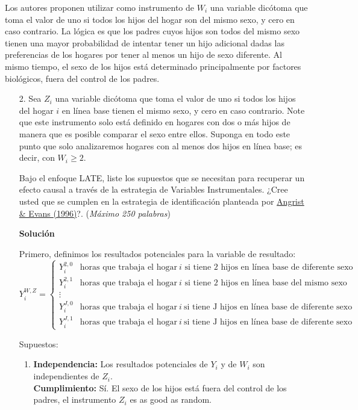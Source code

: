 \documentclass[a4paper, answers, addpoints, 11pt]{exam}
\newenvironment{solucion}{%
  \begin{mdframed}[
    backgroundcolor=blue!5,    %
    linecolor=blue!50,          %
    linewidth=2pt,              %
    leftmargin=10pt,            %
    rightmargin=8pt,           %
    topline=true,              %
    bottomline=true,            %
    roundcorner=10pt,           %
    innerleftmargin=10pt,       %
    innerrightmargin=10pt,      %
    innerbottommargin=10pt,     %
    innertopmargin=10pt         %
  ]%
  \begin{tcolorbox}[colframe=blue!50!black, colback=blue!50, coltitle=white, sharp corners=all, boxrule=1mm, width=\textwidth, halign=left, valign=center, top=0mm, bottom=0mm, left=0mm, right=0mm] \textbf{Solución} \end{tcolorbox} }{\end{mdframed}}
\begin{document}
\bigbreak
Los autores proponen utilizar como instrumento de \(W_i\) una variable dicótoma que toma el valor de uno si todos los hijos del hogar son del mismo sexo, y cero en caso contrario. La lógica es que los padres cuyos hijos son todos del mismo sexo tienen una mayor probabilidad de intentar tener un hijo adicional dadas las preferencias de los hogares por tener al menos un hijo de sexo diferente. Al mismo tiempo, el sexo de los hijos está determinado principalmente por factores biológicos, fuera del control de los padres. 

\begin{enumerate}
    \item[2.] Sea \(Z_i\) una variable dicótoma que toma el valor de uno si todos los hijos del hogar \(i\) en línea base tienen el mismo sexo, y cero en caso contrario. Note que este instrumento solo está definido en hogares con dos o más hijos de manera que es posible comparar el sexo entre ellos. Suponga en todo este punto que solo analizaremos hogares con al menos dos hijos en línea base; es decir, con $W_i \geq 2$.

    \bigbreak
    Bajo el enfoque LATE, liste los supuestos que se necesitan para recuperar un efecto causal a través de la estrategia de Variables Instrumentales. ¿Cree usted que se cumplen en la estrategia de identificación planteada por \href{https://www.nber.org/system/files/working_papers/w5778/w5778.pdf}{Angrist \& Evans (1996)}?. (\textit{Máximo 250 palabras})  

\begin{solucion}
Primero, definimos los resultados potenciales para la variable de resultado: 
\begin{equation*}
    Y_i^{W,Z} = \begin{cases}  Y_i^{2,0} & \text{horas que trabaja el hogar} \: i  \text{ si tiene 2 hijos en línea base  de diferente sexo}  \\Y_i^{2,1} & \text{horas que trabaja el hogar} \:i \text{ si tiene 2 hijos en línea base  del mismo sexo} \\
    \vdots\\
     Y_i^{J,0} & \text{horas que trabaja el hogar} \:i \:\text{si tiene J hijos en línea base  de diferente sexo} \\ Y_i^{J,1} & \text{horas que trabaja el hogar}\: i \: \text{si tiene J hijos en línea base  de diferente sexo}
     \end{cases}
\end{equation*}

Supuestos:
\begin{enumerate}
    \item \textbf{Independencia:}  Los resultados potenciales de $Y_i$ y de $W_i$ son independientes de $Z_i$. \\
    \textbf{Cumplimiento:} Sí. El sexo de los hijos está fuera del control de los padres,  el instrumento $Z_i$ es as good as random.
    

\end{enumerate}
\end{solucion}
\end{enumerate}
\end{document}
